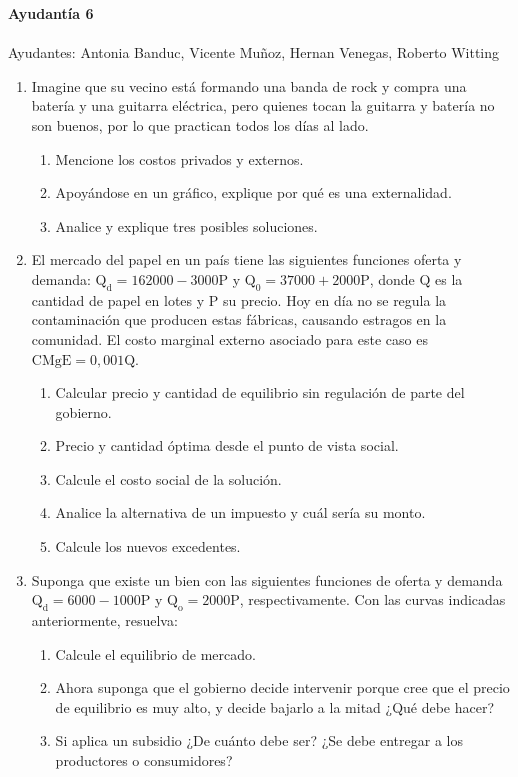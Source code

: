 \documentclass[11pt,letterpaper]{article}
\begin{document}
\begin{center}
    \textbf{\Large{Ayudantía 6}}\\\\
    Ayudantes: Antonia Banduc, Vicente Muñoz, Hernan Venegas, Roberto Witting
    
\end{center}

\begin{enumerate}
\item Imagine que su vecino está formando una banda de rock y compra una batería y una guitarra eléctrica, pero quienes tocan la guitarra y batería no son buenos, por lo que practican todos los días al lado.
\begin{enumerate}
    \item Mencione los costos privados y externos.
    \item Apoyándose en un gráfico, explique por qué es una externalidad.
    \item Analice y explique tres posibles soluciones.
\end{enumerate}


\item El mercado del papel en un país tiene las siguientes funciones oferta y demanda: $\mathrm{Q_d=162000-3000P}$ y  $\mathrm{Q_0=37000+2000P}$, donde $\mathrm{Q}$ es la cantidad de papel en lotes y $\mathrm{P}$ su precio. Hoy en día no se regula la contaminación que producen estas fábricas, causando estragos en la comunidad. El costo marginal externo asociado para este caso es $\mathrm{CMgE=0,001Q}$.
    \begin{enumerate}
        \item Calcular precio y cantidad de equilibrio sin regulación de parte del gobierno.
        \item Precio y cantidad óptima desde el punto de vista social.
        \item Calcule el costo social de la solución.
        \item Analice la alternativa de un impuesto y cuál sería su monto.
        \item Calcule los nuevos excedentes.
    \end{enumerate}

\item Suponga que existe un bien con las siguientes funciones de oferta y demanda $\mathrm{Q_d=6000-1000P}$ y $\mathrm{Q_o=2000P}$, respectivamente. Con las curvas indicadas anteriormente, resuelva:
    \begin{enumerate}
        \item Calcule el equilibrio de mercado.
        \item Ahora suponga que el gobierno decide intervenir porque cree que el precio de equilibrio es muy alto, y decide bajarlo a la mitad ¿Qué debe hacer?
        \item Si aplica un subsidio ¿De cuánto debe ser? ¿Se debe entregar a los productores o consumidores? 
    \end{enumerate}


\end{enumerate}
\end{document}
